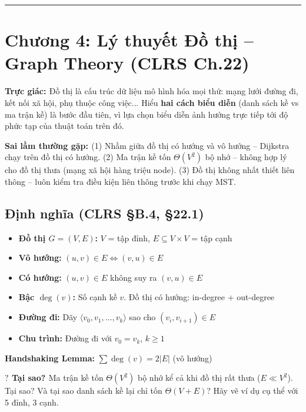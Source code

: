 \documentclass[10pt]{article}
\newcommand{\intuition}[1]{%
  \begin{tcolorbox}[colback=blue!5!white, colframe=blue!60!white, leftrule=3pt,
    toprule=0pt, bottomrule=0pt, rightrule=0pt,
    boxsep=2pt, left=6pt, right=6pt, top=4pt, bottom=4pt]
  \small\textbf{\textcolor{blue!80!black}{Trực giác: }}#1
  \end{tcolorbox}}
\newcommand{\pitfall}[1]{%
  \begin{tcolorbox}[colback=red!5!white, colframe=red!60!white, leftrule=3pt,
    toprule=0pt, bottomrule=0pt, rightrule=0pt,
    boxsep=2pt, left=6pt, right=6pt, top=4pt, bottom=4pt]
  \small\textbf{\textcolor{red!70!black}{Sai lầm thường gặp: }}#1
  \end{tcolorbox}}
\newcommand{\whyprompt}[1]{%
  \begin{tcolorbox}[colback=yellow!8!white, colframe=orange!70!yellow, leftrule=3pt,
    toprule=0pt, bottomrule=0pt, rightrule=0pt,
    boxsep=2pt, left=6pt, right=6pt, top=4pt, bottom=4pt]
  {\small\textbf{\textcolor{orange!80!black}{$\boldsymbol{?}$ Tại sao? }} #1}
  \end{tcolorbox}}
\providecommand{\tightlist}{\setlength{\itemsep}{0pt}\setlength{\parskip}{0pt}}
\begin{document}
\begin{center}\rule{0.5\linewidth}{0.5pt}\end{center}

\section{Chương 4: Lý thuyết Đồ thị -- Graph Theory (CLRS Ch.22)}\label{chux1b0ux1a1ng-4-luxfd-thuyux1ebft-ux111ux1ed3-thux1ecb-clrs-ch.22}

\intuition{Đồ thị là cấu trúc dữ liệu mô hình hóa mọi thứ: mạng lưới đường đi, kết nối xã hội, phụ thuộc công việc... Hiểu \textbf{hai cách biểu diễn} (danh sách kề vs ma trận kề) là bước đầu tiên, vì lựa chọn biểu diễn ảnh hưởng trực tiếp tới độ phức tạp của thuật toán trên đó.}

\pitfall{(1) Nhầm giữa đồ thị có hướng và vô hướng -- Dijkstra chạy trên đồ thị có hướng. (2) Ma trận kề tốn $\Theta(V^2)$ bộ nhớ -- không hợp lý cho đồ thị thưa (mạng xã hội hàng triệu node). (3) Đồ thị không nhất thiết liên thông -- luôn kiểm tra điều kiện liên thông trước khi chạy MST.}

\subsection{\texorpdfstring{Định nghĩa (CLRS \S B.4,
\S 22.1)}{Định nghĩa (CLRS B.4, 22.1)}}\label{ux111ux1ecbnh-nghux129a-clrs-b.4-22.1}

\begin{itemize}
\tightlist
\item
  \textbf{Đồ thị \(G = (V, E)\):} \(V\) = tập đỉnh,
  \(E \subseteq V \times V\) = tập cạnh
\item
  \textbf{Vô hướng:} \((u,v) \in E \Leftrightarrow (v,u) \in E\)
\item
  \textbf{Có hướng:} \((u,v) \in E\) không suy ra \((v,u) \in E\)
\item
  \textbf{Bậc \(\deg(v)\):} Số cạnh kề \(v\). Đồ thị có hướng: in-degree
  + out-degree
\item
  \textbf{Đường đi:} Dãy \(\langle v_0, v_1, \ldots, v_k \rangle\) sao
  cho \((v_i, v_{i+1}) \in E\)
\item
  \textbf{Chu trình:} Đường đi với \(v_0 = v_k\), \(k \geq 1\)
\end{itemize}

\textbf{Handshaking Lemma:} \(\sum \deg(v) = 2|E|\) (vô hướng)

\whyprompt{Ma trận kề tốn $\Theta(V^2)$ bộ nhớ kể cả khi đồ thị rất thưa ($E \ll V^2$). Tại sao? Và tại sao danh sách kề lại chỉ tốn $\Theta(V+E)$? Hãy vẽ ví dụ cụ thể với 5 đỉnh, 3 cạnh.}
\end{document}
